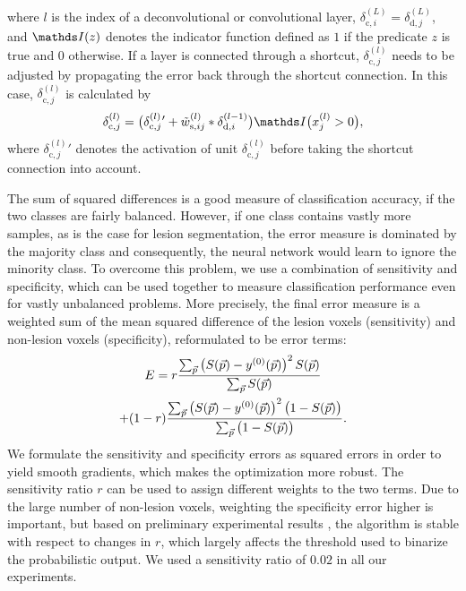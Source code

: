 where $l$ is the index of a deconvolutional or convolutional layer,
$\delta^{(L)}_{\text{c},i} = \delta^{(L)}_{\text{d},j}$, and $\I(z)$ denotes the
indicator function defined as $1$ if the predicate $z$ is true and $0$
otherwise. If a layer is connected through a shortcut,
$\delta^{(l)}_{\text{c},j}$ needs to be adjusted by propagating the error back
through the shortcut connection. In this case, $\delta^{(l)}_{\text{c},j}$ is
calculated by
\begin{equation}
\delta^{(l)}_{\text{c},j} =
\big(\delta^{(l)}_{\text{c},j}{}'+
\tilde{w}^{(l)}_{\text{s},ij}*\delta^{(l-1)}_{\text{d},i}\big)\I\big(x^{(l)}_j
> 0\big),
\label{eq:deltas}
\end{equation}
where $\delta^{(l)}_{\text{c},j}{}'$ denotes the activation of unit
$\delta^{(l)}_{\text{c},j}$ before taking the shortcut connection into account.


The sum of squared differences is a good measure of classification accuracy, if
the two classes are fairly balanced. However, if one class contains vastly more
samples, as is the case for lesion segmentation, the error measure is dominated
by the majority class and consequently, the neural network would learn to ignore
the minority class. To overcome this problem, we use a combination of
sensitivity and specificity, which can be used together to measure
classification performance even for vastly unbalanced problems. More precisely,
the final error measure is a weighted sum of the mean squared difference of the
lesion voxels (sensitivity) and non-lesion voxels (specificity), reformulated to
be error terms:
\begin{multline} 
E = r\frac{\textstyle\sum_{\vect{p}} \left(S(\vect{p}) -
y^{(0)}(\vect{p})\right)^2 S(\vect{p})}{\textstyle\sum_{\vect{p}} S(\vect{p})}
\\
 + (1-r)\frac{\textstyle\sum_{\vect{p}} \left(S(\vect{p}) -
y^{(0)}(\vect{p})\right)^2 \big(1 - S(\vect{p})\big)}{%
\textstyle\sum_{\vect{p}}\big(1 - S(\vect{p})\big)}.
\end{multline}
We formulate the sensitivity and specificity errors as squared errors in order
to yield smooth gradients, which makes the optimization more robust. The
sensitivity ratio $r$ can be used to assign different weights to the two terms.
Due to the large number of non-lesion voxels, weighting the specificity error
higher is important, but based on preliminary experimental results \cite{brosch2015},
the algorithm is stable with respect to changes in $r$, which largely affects the
threshold used to binarize the probabilistic output. We used a sensitivity ratio
of $0.02$ in all our experiments.

